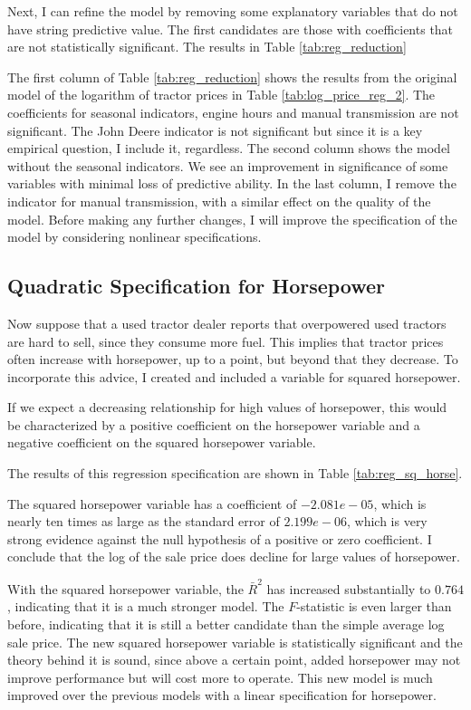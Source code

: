 \documentclass[11pt]{paper}
\begin{document}
Next, I can refine the model by removing some explanatory variables that do not have string predictive value.
The first candidates are those with coefficients that are not statistically significant. 
The results in Table \ref{tab:reg_reduction}



The first column of Table \ref{tab:reg_reduction}
shows the results from the original model of
the logarithm of tractor prices in Table \ref{tab:log_price_reg_2}. 
The coefficients for seasonal indicators, 
engine hours and manual transmission are not significant.
The John Deere indicator is not significant
but since it is a key empirical question, 
I include it, regardless. 
The second column shows the model without the seasonal indicators. 
We see an improvement in significance of
some variables with minimal loss of predictive ability. 
In the last column, I remove the indicator for manual transmission, with a similar effect on the quality of the model. 
Before making any further changes, 
I will improve the specification of the model
by considering nonlinear specifications. 

\clearpage
\subsection{Quadratic Specification for Horsepower}

Now suppose that 
a used tractor dealer reports that overpowered used tractors are hard to sell, since they consume more fuel. 
This implies that tractor prices often increase with horsepower, up to a point, but beyond that they decrease. 
To incorporate this advice, I created and included a variable for squared horsepower. 

If we expect a decreasing relationship for high values of horsepower, 
this would be characterized by 
a positive coefficient on the horsepower variable and
a negative coefficient on the squared horsepower variable. 

The results of this regression specification are shown in 
Table \ref{tab:reg_sq_horse}. 
% 

% 
The squared horsepower variable has a coefficient of $-2.081e-05$, which is nearly ten times as large as the standard error of $2.199e-06$, which is very strong evidence against the null hypothesis of a positive or zero coefficient. 
I conclude that the log of the sale price does decline for large values of horsepower. 


With the squared horsepower variable, the $\bar{R}^2$ has increased substantially to $0.764$, indicating that it is a much stronger model. 
The $F$-statistic is even larger than before, indicating that it is still a better candidate than the simple average log sale price. 
The new squared horsepower variable is statistically significant and the theory behind it is sound, since above a certain point, added horsepower may not improve performance but will cost more to operate. 
This new model is much improved over the previous models with a linear specification for horsepower.
\end{document}
